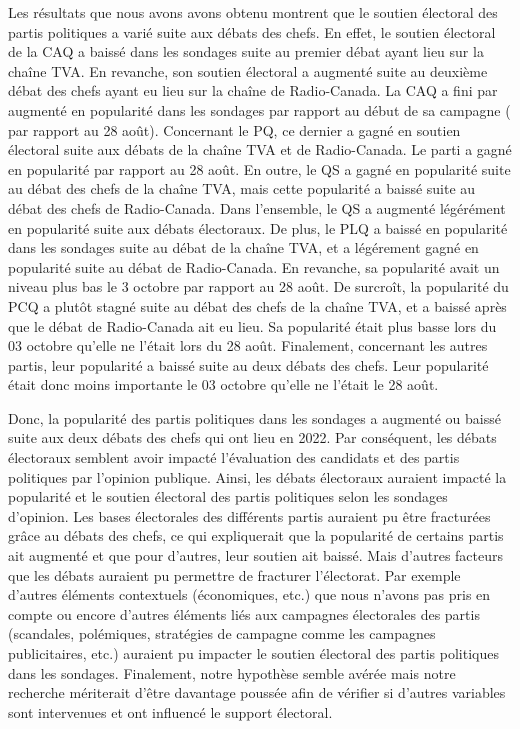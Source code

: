 \documentclass[
  letterpaper,
  DIV=11,
  numbers=noendperiod]{scrartcl}
\begin{document}
Les résultats que nous avons avons obtenu montrent que le soutien
électoral des partis politiques a varié suite aux débats des chefs. En
effet, le soutien électoral de la CAQ a baissé dans les sondages suite
au premier débat ayant lieu sur la chaîne TVA. En revanche, son soutien
électoral a augmenté suite au deuxième débat des chefs ayant eu lieu sur
la chaîne de Radio-Canada. La CAQ a fini par augmenté en popularité dans
les sondages par rapport au début de sa campagne ( par rapport au 28
août). Concernant le PQ, ce dernier a gagné en soutien électoral suite
aux débats de la chaîne TVA et de Radio-Canada. Le parti a gagné en
popularité par rapport au 28 août. En outre, le QS a gagné en popularité
suite au débat des chefs de la chaîne TVA, mais cette popularité a
baissé suite au débat des chefs de Radio-Canada. Dans l'ensemble, le QS
a augmenté légérément en popularité suite aux débats électoraux. De
plus, le PLQ a baissé en popularité dans les sondages suite au débat de
la chaîne TVA, et a légérement gagné en popularité suite au débat de
Radio-Canada. En revanche, sa popularité avait un niveau plus bas le 3
octobre par rapport au 28 août. De surcroît, la popularité du PCQ a
plutôt stagné suite au débat des chefs de la chaîne TVA, et a baissé
après que le débat de Radio-Canada ait eu lieu. Sa popularité était plus
basse lors du 03 octobre qu'elle ne l'était lors du 28 août. Finalement,
concernant les autres partis, leur popularité a baissé suite au deux
débats des chefs. Leur popularité était donc moins importante le 03
octobre qu'elle ne l'était le 28 août.

Donc, la popularité des partis politiques dans les sondages a augmenté
ou baissé suite aux deux débats des chefs qui ont lieu en 2022. Par
conséquent, les débats électoraux semblent avoir impacté l'évaluation
des candidats et des partis politiques par l'opinion publique. Ainsi,
les débats électoraux auraient impacté la popularité et le soutien
électoral des partis politiques selon les sondages d'opinion. Les bases
électorales des différents partis auraient pu être fracturées grâce au
débats des chefs, ce qui expliquerait que la popularité de certains
partis ait augmenté et que pour d'autres, leur soutien ait baissé. Mais
d'autres facteurs que les débats auraient pu permettre de fracturer
l'électorat. Par exemple d'autres éléments contextuels (économiques,
etc.) que nous n'avons pas pris en compte ou encore d'autres éléments
liés aux campagnes électorales des partis (scandales, polémiques,
stratégies de campagne comme les campagnes publicitaires, etc.) auraient
pu impacter le soutien électoral des partis politiques dans les
sondages. Finalement, notre hypothèse semble avérée mais notre recherche
mériterait d'être davantage poussée afin de vérifier si d'autres
variables sont intervenues et ont influencé le support électoral.
\end{document}
